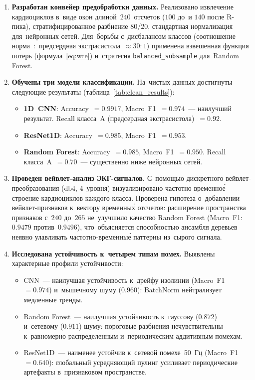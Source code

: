 \begin{enumerate}

\item \textbf{Разработан конвейер предобработки данных.}
Реализовано извлечение кардиоциклов в~виде окон
длиной~$240$~отсчетов ($100$ до~и $140$ после R-пика),
стратифицированное разбиение 80/20, стандартная нормализация
для~нейронных сетей.
Для~борьбы с~дисбалансом классов (соотношение норма~:~предсердная
экстрасистола~$\approx 30\!:\!1$) применена взвешенная функция
потерь (формула~\eqref{eq:wce}) и~стратегия
\texttt{balanced\_subsample} для~Random Forest.

\item \textbf{Обучены три модели классификации.}
На~чистых данных достигнуты следующие результаты
(таблица~\ref{tab:clean_results}):

\begin{itemize}
    \item \textbf{1D~CNN}: Accuracy~$= 0.9917$,
          Macro~F1~$= 0.974$~--- наилучший результат.
          Recall класса~A (предсердная экстрасистола)~$= 0.92$.
    \item \textbf{ResNet1D}: Accuracy~$= 0.985$,
          Macro~F1~$= 0.953$.
    \item \textbf{Random Forest}: Accuracy~$= 0.985$,
          Macro~F1~$= 0.950$.
          Recall класса~A~$= 0.70$~--- существенно ниже
          нейронных сетей.
\end{itemize}

\item \textbf{Проведен вейвлет-анализ ЭКГ-сигналов.}
С~помощью дискретного вейвлет-преобразования (db4, 4~уровня)
визуализировано частотно-временно\'{е} строение кардиоциклов
каждого класса.
Проверена гипотеза о~добавлении вейвлет-признаков к~вектору
временны\'{х} отсчетов: расширение пространства признаков
с~$240$ до~$265$ не~улучшило качество Random Forest
(Macro~F1: $0.9479$ против~$0.9496$), что~объясняется
способностью ансамбля деревьев неявно улавливать
частотно-временны\'{е} паттерны из~сырого сигнала.

\item \textbf{Исследована устойчивость к~четырем типам помех.}
Выявлены характерные профили устойчивости:

\begin{itemize}
    \item CNN~--- наилучшая устойчивость к~дрейфу изолинии
    (Macro~F1~$= 0.974$) и~мышечному шуму ($0.960$):
    BatchNorm нейтрализует медленные тренды.
    \item Random Forest~--- наилучшая устойчивость к~гауссову
    ($0.872$) и~сетевому ($0.911$) шуму:
    пороговые разбиения нечувствительны к~равномерно
    распределенным и~периодическим аддитивным помехам.
    \item ResNet1D~--- наименее устойчив к~сетевой помехе~50~Гц
    (Macro~F1~$= 0.640$): глобальный усредняющий пулинг
    усиливает периодические артефакты в~признаковом
    пространстве.
\end{itemize}


\end{enumerate}
